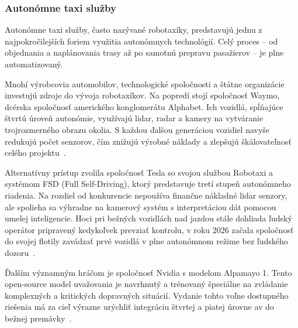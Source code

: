 \subsubsection{Autonómne taxi služby}
Autonómne taxi služby, často nazývané robotaxíky, predstavujú jednu z najpokročilejších foriem využitia autonómnych technológií. Celý proces -- od objednania a naplánovania trasy až po samotnú prepravu pasažierov -- je plne automatizovaný.\par
Mnohí výrobcovia automobilov, technologické spoločnosti a štátne organizácie investujú zdroje do vývoja robotaxíkov. Na popredí stojí spoločnosť Waymo, dcérska spoločnosť amerického konglomerátu Alphabet. Ich vozidlá, spĺňajúce štvrtú úroveň autonómie, využívajú \acrshort{lidar}, \acrshort{radar} a kamery na vytváranie trojrozmerného obrazu okolia. S každou ďalšou generáciou vozidiel navyše redukujú počet senzorov, čím znižujú výrobné náklady a zlepšujú škálovateľnosť celého projektu~\cite{waymo2026}.\par
Alternatívny prístup zvolila spoločnosť Tesla so svojou službou Robotaxi a systémom FSD (Full Self-Driving), ktorý predstavuje tretí stupeň autonómneho riadenia. Na rozdiel od konkurencie nepoužíva finančne nákladné \acrshort{lidar} senzory, ale spolieha sa výhradne na kamerový systém s interpretáciou dát pomocou umelej inteligencie. Hoci pri bežných vozidlách nad jazdou stále dohliada ľudský operátor pripravený kedykoľvek prevziať kontrolu, v roku 2026 začala spoločnosť do svojej flotily zavádzať prvé vozidlá v plne autonómnom režime bez ľudského dozoru~\cite{notateslaapp2026}.\par
Ďalším významným hráčom je spoločnosť Nvidia s modelom Alpamayo 1. Tento open-source model uvažovania je navrhnutý a trénovaný špeciálne na zvládanie komplexných a kritických dopravných situácií. Vydanie tohto voľne dostupného riešenia má za cieľ výrazne urýchliť integráciu štvrtej a piatej úrovne \acrshort{av} do bežnej premávky~\cite{nvidia2026}.
